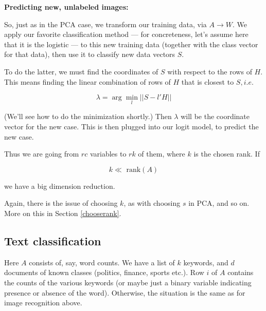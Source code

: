 
\textbf{Predicting new, unlabeled images:}

So, just as in the PCA case, we transform our training data, via $A
\rightarrow W$.  We apply our favorite classification method --- for
concreteness, let's assume here that it is the logistic --- to this new
training data (together with the class vector for that data), then use
it to classify new data vectors $S$.  

To do the latter, we must find the coordinates of $S$ with respect to
the rows of $H$.  This means finding the linear combination of rows of
$H$ that is closest to $S, i.e.$

\begin{equation}
\label{slh}
\lambda = \arg\min_l || S - l'H ||
\end{equation}

(We'll see how to do the minimization shortly.) Then $\lambda$ will be
the coordinate vector for the new case.  This is then plugged into our
logit model, to predict the new case.




Thus we are going from $rc$ variables to $rk$ of them, where $k$ is the
chosen rank.  If

\begin{equation}
k \ll \textrm{ rank}(A)
\end{equation}

we have a big dimension reduction.

Again, there is the issue of choosing $k$, as with choosing $s$ in PCA,
and so on.  More on this in Section \ref{chooserank}.

\subsection{Text classification}

Here $A$ consists of, say, word counts. We have a list of $k$ keywords,
and $d$ documents of known classes (politics, finance, sports etc.).
Row $i$ of $A$ contains the counts of the various keywords (or maybe
just a binary variable indicating presence or absence of the word).
Otherwise, the situation is the same as for image recognition above.

